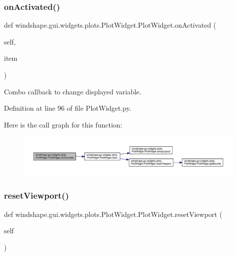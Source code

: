 \subsubsection{\texorpdfstring{on\+Activated()}{onActivated()}}
{\footnotesize\ttfamily def windshape.\+gui.\+widgets.\+plots.\+Plot\+Widget.\+Plot\+Widget.\+on\+Activated (\begin{DoxyParamCaption}\item[{}]{self,  }\item[{}]{item }\end{DoxyParamCaption})}

\begin{DoxyVerb}Combo callback to change displayed variable.\end{DoxyVerb}
 

Definition at line 96 of file Plot\+Widget.\+py.

Here is the call graph for this function\+:\nopagebreak
\begin{figure}[H]
\begin{center}
\leavevmode
\includegraphics[width=350pt]{classwindshape_1_1gui_1_1widgets_1_1plots_1_1_plot_widget_1_1_plot_widget_a3e65ce3d2fcd5e51ee91a0ce953f6749_cgraph}
\end{center}
\end{figure}
\mbox{\label{classwindshape_1_1gui_1_1widgets_1_1plots_1_1_plot_widget_1_1_plot_widget_afa4ffce30d37b17607e1f5acba0e357e}} 
\subsubsection{\texorpdfstring{reset\+Viewport()}{resetViewport()}}
{\footnotesize\ttfamily def windshape.\+gui.\+widgets.\+plots.\+Plot\+Widget.\+Plot\+Widget.\+reset\+Viewport (\begin{DoxyParamCaption}\item[{}]{self }\end{DoxyParamCaption})}


